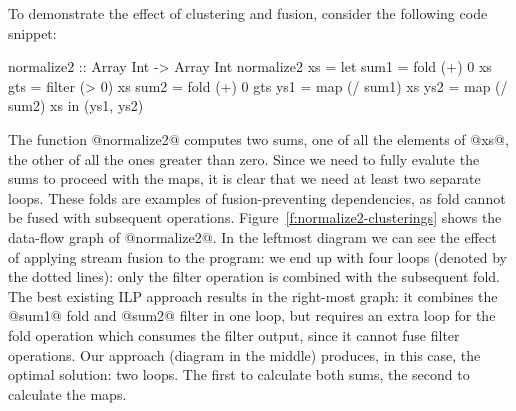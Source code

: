 
To demonstrate the effect of clustering and fusion, consider the following code snippet:
\begin{code}
 normalize2 :: Array Int -> Array Int
 normalize2 xs
  = let sum1 = fold   (+)  0   xs
        gts  = filter (>   0)  xs
        sum2 = fold   (+)  0   gts
        ys1  = map    (/ sum1) xs
        ys2  = map    (/ sum2) xs
    in (ys1, ys2)
\end{code}
The function @normalize2@ computes two sums, one of all the elements of @xs@, the other of all the ones greater than zero. Since we need to fully evalute the sums to proceed with the maps, it is clear that we need at least two separate loops. These folds are examples of fusion-preventing dependencies, as fold cannot be fused with subsequent operations. Figure~\ref{f:normalize2-clusterings} shows the data-flow graph of @normalize2@. In the leftmost diagram we can see the effect of applying stream fusion to the program: we end up with four loops (denoted by the dotted lines): only the filter operation is combined with the subsequent fold. The best existing ILP approach results in the right-most graph: it combines the @sum1@ fold and @sum2@ filter in one loop, but requires an extra loop for the fold operation which consumes the filter output, since it cannot fuse filter operations. Our approach (diagram in the middle) produces, in this case, the optimal solution: two loops. The first to calculate both sums, the second to calculate the maps.


